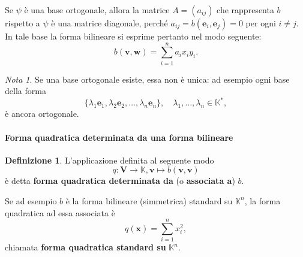 \documentclass{article}
\theoremstyle{plain}
\theoremstyle{definition}
\newtheorem{defn}{Definizione}[section]
\theoremstyle{remark}
\newtheorem{note}{Nota}
\begin{document}
\vspace{10pt}

Se $\psi$ è una base ortogonale, allora la matrice $A = (a_{ij})$ che rappresenta $b$ rispetto a $\psi$ è una 
matrice diagonale, perché $a_{ij} = b(\mathbf{e}_i, \mathbf{e}_j) = 0$ per ogni $i \neq j$. 
In tale base la forma bilineare si esprime pertanto nel modo seguente:
\begin{equation}\label{quindiciottoo}
b(\mathbf{v}, \mathbf{w}) = \sum_{i=1}^{n}a_i x_i y_i.
\end{equation}

\vspace{10pt}

\begin{note}
Se una base ortogonale esiste, essa non è unica: ad esempio ogni base della forma 
\[\{\lambda_1 \mathbf{e}_1, \lambda_2 \mathbf{e}_2, \ldots, \lambda_n \mathbf{e}_n\},\quad\lambda_1, \ldots, \lambda_n \in \mathbb{K}^*,\]
è ancora ortogonale.
\end{note}

\vspace{10pt}

\paragraph{Forma quadratica determinata da una forma bilineare}
\begin{bxthm}
\begin{defn}
L'applicazione definita al seguente modo
\[
q: \mathbf{V} \to \mathbb{K}, \mathbf{v}\mapsto b(\mathbf{v}, \mathbf{v})
\]
è detta \textbf{forma quadratica determinata da} (o \textbf{associata a}) $b$.    
\end{defn}
\end{bxthm}

\vspace{10pt}

Se ad esempio $b$ è la forma bilineare (simmetrica) standard su $\mathbb{K}^n$, la forma quadratica ad essa associata è
\[
q(\mathbf{x}) = \sum_{i=1}^{n}x_i^2,
\]
chiamata \textbf{forma quadratica standard su} $\mathbb{K}^n$.

\vspace{10pt}
\end{document}
